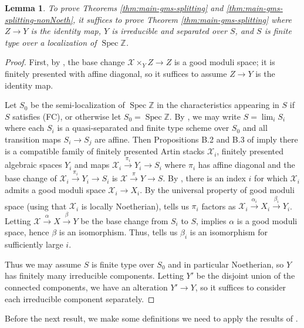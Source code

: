 \documentclass{amsart}
\newtheorem{lemma}[lemma]{Lemma}
\theoremstyle{definition}
\newcommand{\bZ}{\mathbb{Z}}
\newcommand{\cX}{\mathcal{X}}
\DeclareMathOperator{\Spec}{Spec}
\begin{document}
	\begin{lemma}\label{l:SNoeth}
		To prove Theorems \ref{thm:main-gms-splitting} and \ref{thm:main-gms-splitting-nonNoeth}, it suffices to prove Theorem \ref{thm:main-gms-splitting} where $Z\to Y$ is the identity map, $Y$ is irreducible and separated over $S$, and $S$ is finite type over a localization of $\Spec\bZ$.
	\end{lemma}
	\begin{proof}
		
		First, by \cite[Proposition 4.7]{Alper}, the base change $\cX\times_YZ\to Z$ is a good moduli space; it is finitely presented with affine diagonal, so it suffices to assume $Z\to Y$ is the identity map.
		
		Let $S_0$ be the semi-localization of $\Spec\bZ$ in the characteristics appearing in $S$ if $S$ satisfies (FC), or otherwise let $S_0 = \Spec \bZ$. By \cite[Tag 07SU]{stacks-project}, we may write $S=\lim_i S_i$ where each $S_i$ is a quasi-separated and finite type scheme over $S_0$ and all transition maps $S_i\to S_j$ are affine. Then Propositions B.2 and B.3 of \cite{Rydh2015} imply there is a compatible family of finitely presented Artin stacks $\cX_i$, finitely presented algebraic spaces $Y_i$ and maps $\cX_i\xrightarrow{\pi_i} Y_i\to S_i$ where $\pi_i$ has affine diagonal and the base change of $\cX_i\xrightarrow{\pi_i} Y_i\to S_i$ is $\cX\xrightarrow{\pi} Y\to S$. By \cite[Theorem 5.10]{RydhNoetherianAbsolute}, there is an index $i$ for which $\cX_i$ admits a good moduli space $\cX_i\to X_i$. By the universal property of good moduli space (using that $\cX_i$ is locally Noetherian), \cite[Theorem 6.6]{Alper} tells us $\pi_i$ factors as $\cX_i\xrightarrow{\alpha_i} X_i\xrightarrow{\beta_i}Y_i$. Letting $\cX\xrightarrow{\alpha} X\xrightarrow{\beta}Y$ be the base change from $S_i$ to $S$, \cite[Proposition 4.7]{Alper} implies $\alpha$ is a good moduli space, hence $\beta$ is an isomorphism. Thus, \cite[Propositions B.3]{Rydh2015} tells us $\beta_i$ is an isomorphism for sufficiently large $i$.
		
		Thus we may assume $S$ is finite type over $S_0$ and in particular Noetherian, so $Y$ has finitely many irreducible components. Letting $Y'$ be the disjoint union of the connected components, we have an alteration $Y'\to Y$, so it suffices to consider each irreducible component separately.
	\end{proof}
	
	Before the next result, we make some definitions we need to apply the results of \cite{ER}. 
	
\end{document}
